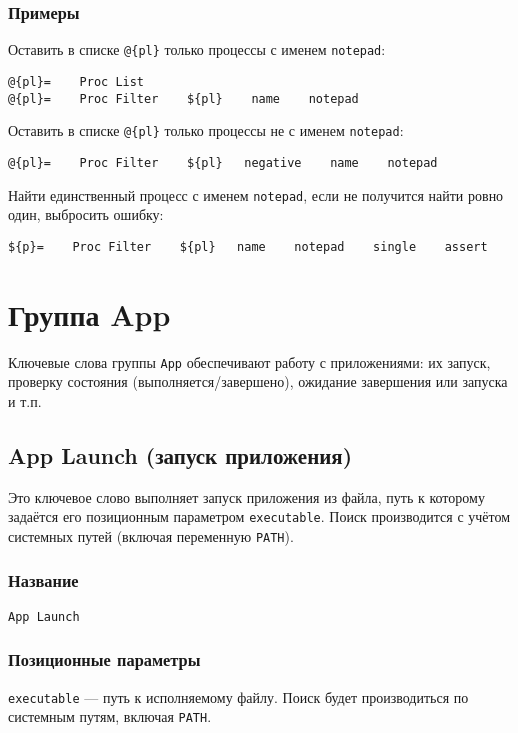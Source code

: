 \documentclass[11pt]{book} %
\begin{document}
\subsubsection*{Примеры}
Оставить в списке \verb"@{pl}" только процессы с именем \verb"notepad":
\begin{verbatim}@{pl}=    Proc List
@{pl}=    Proc Filter    ${pl}    name    notepad\end{verbatim}

Оставить в списке \verb"@{pl}" только процессы не с именем \verb"notepad":
\begin{verbatim}@{pl}=    Proc Filter    ${pl}   negative    name    notepad\end{verbatim}

Найти единственный процесс с именем \verb"notepad", если не получится найти ровно один, выбросить ошибку:
\begin{verbatim}${p}=    Proc Filter    ${pl}   name    notepad    single    assert\end{verbatim}



\section{Группа App}
Ключевые слова группы \verb"App" обеспечивают работу с приложениями: их запуск, проверку состояния (выполняется/завершено), ожидание завершения или запуска и т.п.


\subsection{App Launch (запуск приложения)}
Это ключевое слово выполняет запуск приложения из файла, путь к которому задаётся его позиционным параметром \verb"executable". Поиск производится с учётом системных путей (включая переменную \verb"PATH").


\subsubsection*{Название} 
\verb"App Launch"

\subsubsection*{Позиционные параметры} 

\verb"executable" --- путь к исполняемому файлу. Поиск будет производиться по системным путям, включая \verb"PATH".
\end{document}
